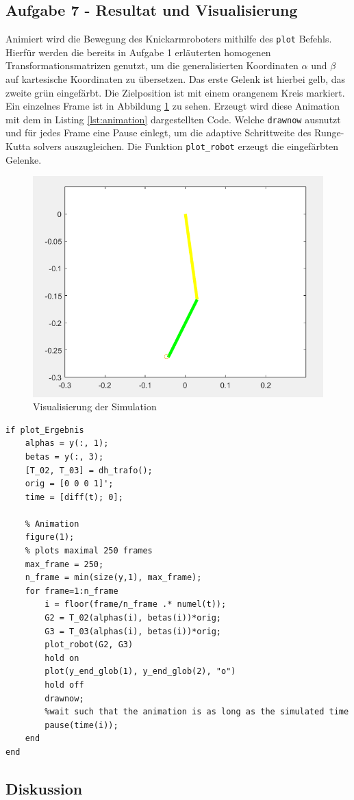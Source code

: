\subsection*{Aufgabe 7 - Resultat und Visualisierung}

Animiert wird die Bewegung des Knickarmroboters mithilfe des \texttt{plot} Befehls. Hierfür werden die bereits in Aufgabe 1 erläuterten homogenen Transformationsmatrizen genutzt, um die generalisierten Koordinaten $\alpha$ und $\beta$ auf kartesische Koordinaten zu übersetzen. Das erste Gelenk ist hierbei gelb, das zweite grün eingefärbt. Die Zielposition ist mit einem orangenem Kreis markiert. Ein einzelnes Frame ist in Abbildung \ref{fig:visualisierung} zu sehen. Erzeugt wird diese Animation mit dem in Listing \ref{lst:animation} dargestellten Code. Welche \texttt{drawnow} ausnutzt und für jedes Frame eine Pause einlegt, um die adaptive Schrittweite des Runge-Kutta solvers auszugleichen. Die Funktion \texttt{plot_robot} erzeugt die eingefärbten Gelenke.

\begin{figure}[H]
    \centering
    \includegraphics[width=0.8\linewidth]{img/visualisierung.png}
    \caption{Visualisierung der Simulation}
    \label{fig:visualisierung}
\end{figure}




\begin{lstlisting}[caption={Definition der rechten Seite},label={lst:animation}]
    %% Visualization
if plot_Ergebnis
    alphas = y(:, 1);
    betas = y(:, 3);
    [T_02, T_03] = dh_trafo();
    orig = [0 0 0 1]';
    time = [diff(t); 0];
    
    % Animation
    figure(1);
    % plots maximal 250 frames
    max_frame = 250;
    n_frame = min(size(y,1), max_frame);
    for frame=1:n_frame
        i = floor(frame/n_frame .* numel(t));
        G2 = T_02(alphas(i), betas(i))*orig;
        G3 = T_03(alphas(i), betas(i))*orig;
        plot_robot(G2, G3)
        hold on
        plot(y_end_glob(1), y_end_glob(2), "o")
        hold off
        drawnow;
        %wait such that the animation is as long as the simulated time
        pause(time(i));
    end
end
\end{lstlisting}




\subsection*{Diskussion}